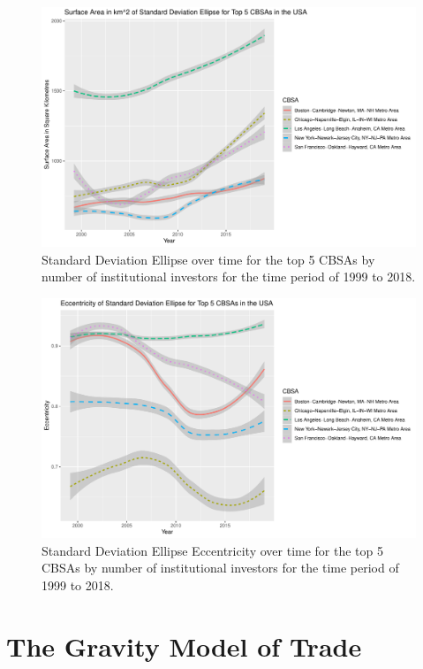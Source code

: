 \begin{figure}
	\centering
	\includegraphics[width=1\linewidth]{Figures/ChapterIII/Standard_Deviation_ellipse}
	\caption[Standard Deviation Ellipse]{Standard Deviation Ellipse over time for the top 5 CBSAs by number of institutional investors for the time period of 1999 to 2018.}
	\label{fig:standarddeviationellipse}
\end{figure}

\begin{figure}
	\centering
	\includegraphics[width=1\linewidth]{Figures/ChapterIII/Standard_Deviation_ellipse_Eccentricity}
	\caption[Standard Deviation Ellipse Eccentricity]{Standard Deviation Ellipse Eccentricity over time for the top 5 CBSAs by number of institutional investors for the time period of 1999 to 2018.}
	\label{fig:Standard_Deviation_ellipse_Eccentricity}
\end{figure}


\section{The Gravity Model of Trade}


